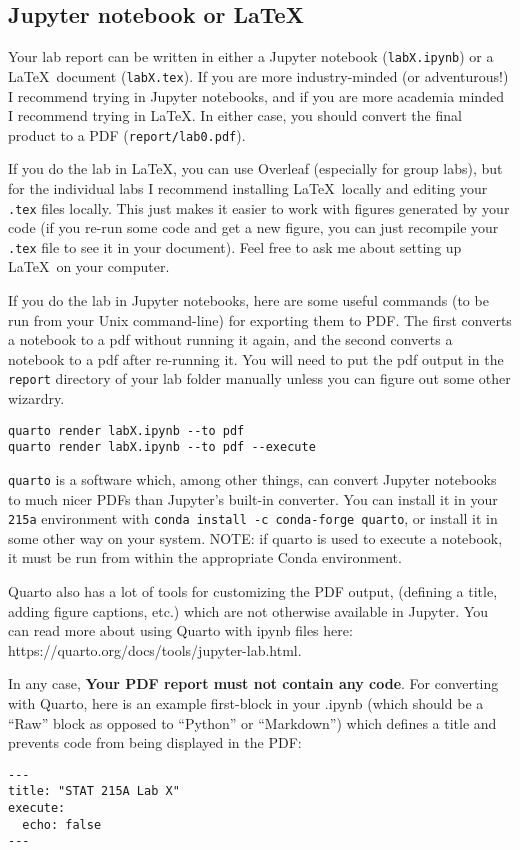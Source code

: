 \documentclass[letterpaper,12pt]{article}
\begin{document}
\subsection{Jupyter notebook or LaTeX}

Your lab report can be written in either a Jupyter notebook (\texttt{labX.ipynb}) or a \LaTeX\ document (\texttt{labX.tex}). If you are more industry-minded (or adventurous!) I recommend trying in Jupyter notebooks, and if you are more academia minded I recommend trying in \LaTeX. In either case, you should convert the final product to a PDF (\texttt{report/lab0.pdf}).

If you do the lab in \LaTeX, you can use Overleaf (especially for group labs), but for the individual labs I recommend installing \LaTeX\ locally and editing your \texttt{.tex} files locally. This just makes it easier to work with figures generated by your code (if you re-run some code and get a new figure, you can just recompile your \texttt{.tex} file to see it in your document). Feel free to ask me about setting up \LaTeX\ on your computer.

If you do the lab in Jupyter notebooks, here are some useful commands (to be run from your Unix command-line) for exporting them to PDF. The first converts a notebook to a pdf without running it again, and the second converts a notebook to a pdf after re-running it. You will need to put the pdf output in the \texttt{report} directory of your lab folder manually unless you can figure out some other wizardry.
\begin{verbatim}
quarto render labX.ipynb --to pdf
quarto render labX.ipynb --to pdf --execute
\end{verbatim}
\texttt{quarto} is a software which, among other things, can convert Jupyter notebooks to much nicer PDFs than Jupyter's built-in converter. You can install it in your \texttt{215a} environment with \texttt{conda install -c conda-forge quarto}, or install it in some other way on your system. NOTE: if quarto is used to execute a notebook, it must be run from within the appropriate Conda environment.

Quarto also has a lot of tools for customizing the PDF output, (defining a title, adding figure captions, etc.) which are not otherwise available in Jupyter. You can read more about using Quarto with ipynb files here: https://quarto.org/docs/tools/jupyter-lab.html.

In any case, \textbf{Your PDF report must not contain any code}. For converting with Quarto, here is an example first-block in your .ipynb (which should be a ``Raw'' block as opposed to ``Python'' or ``Markdown'') which defines a title and prevents code from being displayed in the PDF:
\begin{verbatim}
---
title: "STAT 215A Lab X"
execute:
  echo: false
---
\end{verbatim}
\end{document}
